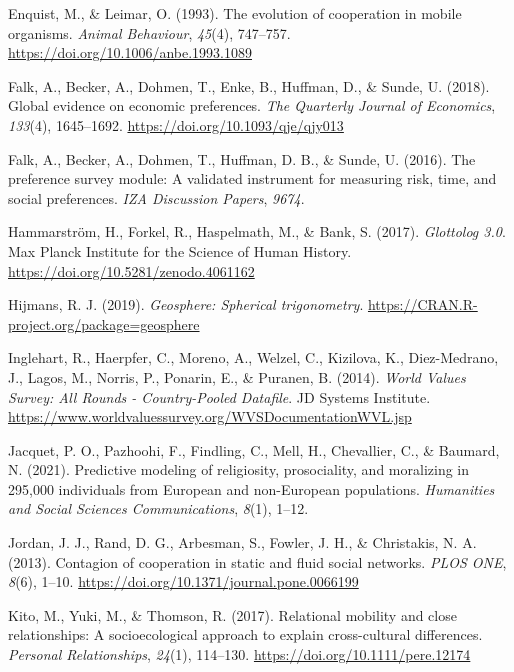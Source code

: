 \documentclass[english,man,floatsintext]{apa6}
\begin{document}
\leavevmode\hypertarget{ref-Enquist1993}{}%
Enquist, M., \& Leimar, O. (1993). The evolution of cooperation in mobile organisms. \emph{Animal Behaviour}, \emph{45}(4), 747--757. \url{https://doi.org/10.1006/anbe.1993.1089}

\leavevmode\hypertarget{ref-Falk2018}{}%
Falk, A., Becker, A., Dohmen, T., Enke, B., Huffman, D., \& Sunde, U. (2018). Global evidence on economic preferences. \emph{The Quarterly Journal of Economics}, \emph{133}(4), 1645--1692. \url{https://doi.org/10.1093/qje/qjy013}

\leavevmode\hypertarget{ref-Falk2016}{}%
Falk, A., Becker, A., Dohmen, T., Huffman, D. B., \& Sunde, U. (2016). The preference survey module: A validated instrument for measuring risk, time, and social preferences. \emph{IZA Discussion Papers}, \emph{9674}.

\leavevmode\hypertarget{ref-Glottolog}{}%
Hammarström, H., Forkel, R., Haspelmath, M., \& Bank, S. (2017). \emph{Glottolog 3.0}. Max Planck Institute for the Science of Human History. \url{https://doi.org/10.5281/zenodo.4061162}

\leavevmode\hypertarget{ref-Hijmans2019}{}%
Hijmans, R. J. (2019). \emph{Geosphere: Spherical trigonometry}. \url{https://CRAN.R-project.org/package=geosphere}

\leavevmode\hypertarget{ref-WVS2014}{}%
Inglehart, R., Haerpfer, C., Moreno, A., Welzel, C., Kizilova, K., Diez-Medrano, J., Lagos, M., Norris, P., Ponarin, E., \& Puranen, B. (2014). \emph{World Values Survey: All Rounds - Country-Pooled Datafile}. JD Systems Institute. \url{https://www.worldvaluessurvey.org/WVSDocumentationWVL.jsp}

\leavevmode\hypertarget{ref-Jacquet2021}{}%
Jacquet, P. O., Pazhoohi, F., Findling, C., Mell, H., Chevallier, C., \& Baumard, N. (2021). Predictive modeling of religiosity, prosociality, and moralizing in 295,000 individuals from European and non-European populations. \emph{Humanities and Social Sciences Communications}, \emph{8}(1), 1--12.

\leavevmode\hypertarget{ref-Jordan2013}{}%
Jordan, J. J., Rand, D. G., Arbesman, S., Fowler, J. H., \& Christakis, N. A. (2013). Contagion of cooperation in static and fluid social networks. \emph{PLOS ONE}, \emph{8}(6), 1--10. \url{https://doi.org/10.1371/journal.pone.0066199}

\leavevmode\hypertarget{ref-Kito2017}{}%
Kito, M., Yuki, M., \& Thomson, R. (2017). Relational mobility and close relationships: A socioecological approach to explain cross-cultural differences. \emph{Personal Relationships}, \emph{24}(1), 114--130. \url{https://doi.org/10.1111/pere.12174}
\end{document}
